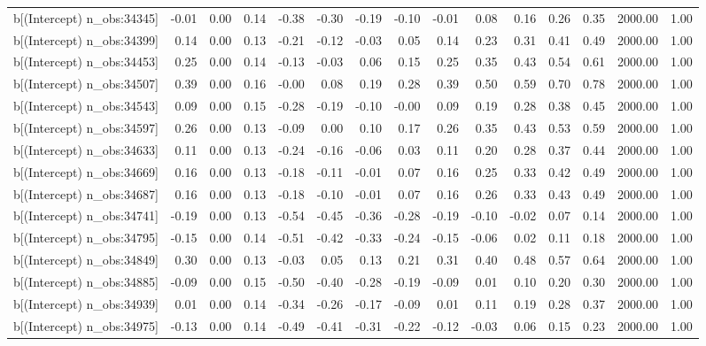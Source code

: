 \begin{table}[ht]
\begin{tabular}{rrrrrrrrrrrrrrr}
  b[(Intercept) n\_obs:34345] & -0.01 & 0.00 & 0.14 & -0.38 & -0.30 & -0.19 & -0.10 & -0.01 & 0.08 & 0.16 & 0.26 & 0.35 & 2000.00 & 1.00 \\ 
  b[(Intercept) n\_obs:34399] & 0.14 & 0.00 & 0.13 & -0.21 & -0.12 & -0.03 & 0.05 & 0.14 & 0.23 & 0.31 & 0.41 & 0.49 & 2000.00 & 1.00 \\ 
  b[(Intercept) n\_obs:34453] & 0.25 & 0.00 & 0.14 & -0.13 & -0.03 & 0.06 & 0.15 & 0.25 & 0.35 & 0.43 & 0.54 & 0.61 & 2000.00 & 1.00 \\ 
  b[(Intercept) n\_obs:34507] & 0.39 & 0.00 & 0.16 & -0.00 & 0.08 & 0.19 & 0.28 & 0.39 & 0.50 & 0.59 & 0.70 & 0.78 & 2000.00 & 1.00 \\ 
  b[(Intercept) n\_obs:34543] & 0.09 & 0.00 & 0.15 & -0.28 & -0.19 & -0.10 & -0.00 & 0.09 & 0.19 & 0.28 & 0.38 & 0.45 & 2000.00 & 1.00 \\ 
  b[(Intercept) n\_obs:34597] & 0.26 & 0.00 & 0.13 & -0.09 & 0.00 & 0.10 & 0.17 & 0.26 & 0.35 & 0.43 & 0.53 & 0.59 & 2000.00 & 1.00 \\ 
  b[(Intercept) n\_obs:34633] & 0.11 & 0.00 & 0.13 & -0.24 & -0.16 & -0.06 & 0.03 & 0.11 & 0.20 & 0.28 & 0.37 & 0.44 & 2000.00 & 1.00 \\ 
  b[(Intercept) n\_obs:34669] & 0.16 & 0.00 & 0.13 & -0.18 & -0.11 & -0.01 & 0.07 & 0.16 & 0.25 & 0.33 & 0.42 & 0.49 & 2000.00 & 1.00 \\ 
  b[(Intercept) n\_obs:34687] & 0.16 & 0.00 & 0.13 & -0.18 & -0.10 & -0.01 & 0.07 & 0.16 & 0.26 & 0.33 & 0.43 & 0.49 & 2000.00 & 1.00 \\ 
  b[(Intercept) n\_obs:34741] & -0.19 & 0.00 & 0.13 & -0.54 & -0.45 & -0.36 & -0.28 & -0.19 & -0.10 & -0.02 & 0.07 & 0.14 & 2000.00 & 1.00 \\ 
  b[(Intercept) n\_obs:34795] & -0.15 & 0.00 & 0.14 & -0.51 & -0.42 & -0.33 & -0.24 & -0.15 & -0.06 & 0.02 & 0.11 & 0.18 & 2000.00 & 1.00 \\ 
  b[(Intercept) n\_obs:34849] & 0.30 & 0.00 & 0.13 & -0.03 & 0.05 & 0.13 & 0.21 & 0.31 & 0.40 & 0.48 & 0.57 & 0.64 & 2000.00 & 1.00 \\ 
  b[(Intercept) n\_obs:34885] & -0.09 & 0.00 & 0.15 & -0.50 & -0.40 & -0.28 & -0.19 & -0.09 & 0.01 & 0.10 & 0.20 & 0.30 & 2000.00 & 1.00 \\ 
  b[(Intercept) n\_obs:34939] & 0.01 & 0.00 & 0.14 & -0.34 & -0.26 & -0.17 & -0.09 & 0.01 & 0.11 & 0.19 & 0.28 & 0.37 & 2000.00 & 1.00 \\ 
  b[(Intercept) n\_obs:34975] & -0.13 & 0.00 & 0.14 & -0.49 & -0.41 & -0.31 & -0.22 & -0.12 & -0.03 & 0.06 & 0.15 & 0.23 & 2000.00 & 1.00 \\ 

\end{tabular}
\end{table}
